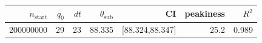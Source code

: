 \begin{tabular}{r r r r r r r}
\hline
$n_{\mathrm{start}}$ & $q_0$ & $dt$ & $\theta_{\mathrm{sub}}$ & CI & peakiness & $R^2$ \\
\hline
200000000 & 29 & 23 & 88.335 & [88.324,88.347] & 25.2 & 0.989 \\
\hline
\end{tabular}
